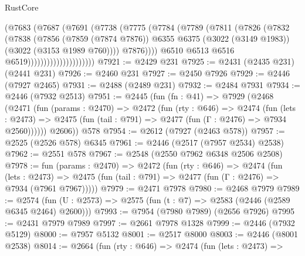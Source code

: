 \begin{lexlean}{RustCore}
\begin{coremodule}
                                  (@7683
                                    (@7687
                                      (@7691
                                        (@7738
                                          (@7775
                                            (@7784
                                              (@7789
                                                (@7811
                                                  (@7826
                                                    (@7832
                                                      (@7838
                                                        (@7856
                                                          (@7859 (@7874 @7876))
                                                          @6355
                                                          @6375
                                                          (@3022 (@3149 @1983))
                                                          (@3022 (@3153 @1989 @760))))
                                                      @7876))))
                                              @6510
                                              @6513
                                              @6516
                                              @6519)))))))))))))))))))))
@7921 := @2429 @231
@7925 := @2431 (@2435 @231) (@2441 @231)
@7926 := @2460 @231
@7927 := @2450 @7926
@7929 := @2446 (@7927 @2465)
@7931 := @2488 (@2489 @231)
@7932 := @2484 @7931
@7934 := @2446 (@7932 @2513)
@7951 := @2445
    (fun (fn : @41) =>
    @7929
      (@2468
        (@2471
          (fun (params : @2470) =>
          @2472
            (fun (rty : @646) =>
            @2474
              (fun (lets : @2473) =>
              @2475 (fun (tail : @791) => @2477 (fun (Γ : @2476) => @7934 @2560))))))
        @2606))
    @578
@7954 := @2612 (@7927 (@2463 @578))
@7957 := @2525 (@2526 @578) @6345
@7961 := @2446 (@2517 (@7957 @2534) @2538)
@7962 := @2551 @578
@7967 := @2548 (@2550 @7962 @6348 @2506 @2508)
@7978 := fun (params : @2470) =>
  @2472
    (fun (rty : @646) =>
    @2474
      (fun (lets : @2473) =>
      @2475 (fun (tail : @791) => @2477 (fun (Γ : @2476) => @7934 (@7961 @7967)))))
@7979 := @2471 @7978
@7980 := @2468 @7979
@7989 := @2574 (fun (U : @2573) => @2575 (fun (t : @7) => @2583 (@2446 (@2589 @6345 @2464) @2600)))
@7993 := @7954 (@7980 @7989) (@2656 @7926)
@7995 := @2431 @7979 @7989
@7997 := @2661 @7978 @1328
@7999 := @2446 (@7932 @5129)
@8000 := @7957 @5132
@8001 := @2517 @8000
@8003 := @2446 (@8001 @2538)
@8014 := @2664
    (fun (rty : @646) =>
    @2474
      (fun (lets : @2473) =>

\end{coremodule}
\end{lexlean}
